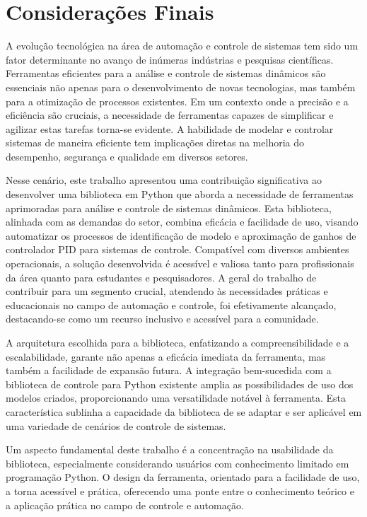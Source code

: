 \chapter{Considerações Finais}

A evolução tecnológica na área de automação e controle de sistemas tem sido um fator determinante no avanço de inúmeras
indústrias e pesquisas científicas.
Ferramentas eficientes para a análise e controle de sistemas dinâmicos são essenciais não apenas para o desenvolvimento
de novas tecnologias, mas também para a otimização de processos existentes.
Em um contexto onde a precisão e a eficiência são cruciais, a necessidade de ferramentas capazes de simplificar e
agilizar estas tarefas torna-se evidente.
A habilidade de modelar e controlar sistemas de maneira eficiente tem implicações diretas na melhoria do desempenho,
segurança e qualidade em diversos setores.

Nesse cenário, este trabalho apresentou uma contribuição significativa ao desenvolver uma biblioteca em Python que
aborda a necessidade de ferramentas aprimoradas para análise e controle de sistemas dinâmicos.
Esta biblioteca, alinhada com as demandas do setor, combina eficácia e facilidade de uso, visando automatizar os
processos de identificação de modelo e aproximação de ganhos de controlador PID para sistemas de controle.
Compatível com diversos ambientes operacionais, a solução desenvolvida é acessível e valiosa tanto para profissionais
da área quanto para estudantes e pesquisadores.
A geral do trabalho de contribuir para um segmento crucial, atendendo às necessidades práticas e educacionais no
campo de automação e controle, foi efetivamente alcançado, destacando-se como um recurso inclusivo e acessível para a
comunidade.

A arquitetura escolhida para a biblioteca, enfatizando a compreensibilidade e a escalabilidade, garante não apenas a
eficácia imediata da ferramenta, mas também a facilidade de expansão futura.
A integração bem-sucedida com a biblioteca de controle para Python existente amplia as possibilidades de uso dos modelos
criados, proporcionando uma versatilidade notável à ferramenta.
Esta característica sublinha a capacidade da biblioteca de se adaptar e ser aplicável em uma variedade de cenários de
controle de sistemas.

Um aspecto fundamental deste trabalho é a concentração na usabilidade da biblioteca, especialmente considerando usuários
com conhecimento limitado em programação Python.
O design da ferramenta, orientado para a facilidade de uso, a torna acessível e prática, oferecendo uma ponte entre o
conhecimento teórico e a aplicação prática no campo de controle e automação.

